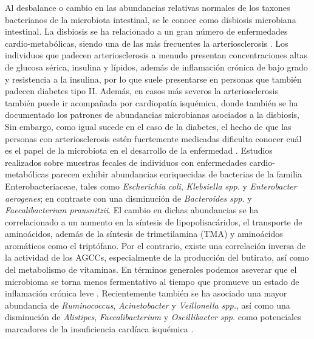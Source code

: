 \documentclass[
]{book}
\begin{document}
Al desbalance o cambio en las abundancias relativas normales de los taxones bacterianos de la microbiota intestinal, se le conoce como disbiosis microbiana intestinal. La disbiosis se ha relacionado a un gran número de enfermedades cardio-metabólicas, siendo una de las más frecuentes la arteriosclerosis \citep{fan2016comprehensive}. Los individuos que padecen arteriosclerosis a menudo presentan concentraciones altas de glucosa sérica, insulina y lípidos, además de inflamación crónica de bajo grado y resistencia a la insulina, por lo que suele presentarse en personas que también padecen diabetes tipo II. Además, en casos más severos la arteriosclerosis también puede ir acompañada por cardiopatía isquémica, donde también se ha documentado los patrones de abundancias microbianas asociados a la disbiosis, Sin embargo, como igual sucede en el caso de la diabetes, el hecho de que las personas con arteriosclerosis estén fuertemente medicadas dificulta conocer cuál es el papel de la microbiota en el desarrollo de la enfermedad \citep{michos2019lipid}. Estudios realizados sobre muestras fecales de individuos con enfermedades cardio-metabólicas parecen exhibir abundancias enriquecidas de bacterias de la familia Enterobacteriaceae, tales como \emph{Escherichia coli}, \emph{Klebsiella spp.} y \emph{Enterobacter aerogenes}; en contraste con una disminución de \emph{Bacteroides spp.} y \emph{Faecalibacterium prausnitzii}. El cambio en dichas abundancias se ha correlacionado a un aumento en la síntesis de lipopolisacáridos, el transporte de aminoácidos, además de la síntesis de trimetilamina (TMA) y aminoácidos aromáticos como el triptófano. Por el contrario, existe una correlación inversa de la actividad de los AGCCs, especialmente de la producción del butirato, así como del metabolismo de vitaminas. En términos generales podemos aseverar que el microbioma se torna menos fermentativo al tiempo que promueve un estado de inflamación crónica leve \citep{sokol2008faecalibacterium}. Recientemente también se ha asociado una mayor abundancia de \emph{Ruminococcus}, \emph{Acinetobacter} y \emph{Veillonella spp.}, así como una disminución de \emph{Alistipes}, \emph{Faecalibacterium} y \emph{Oscillibacter spp.} como potenciales marcadores de la insuficiencia cardíaca isquémica \citep{cui2018metagenomic}.
\end{document}
